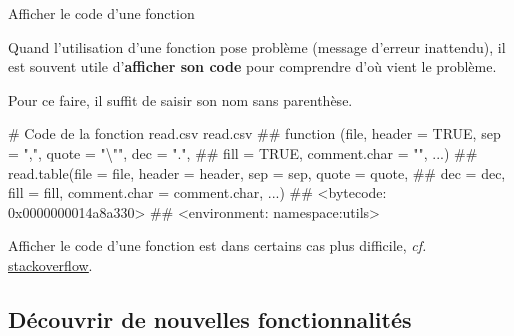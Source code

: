 \documentclass[12pt,ignorenonframetext,handout,]{beamer}
\newenvironment{Shaded}{}{}
\newcommand{\CommentTok}[1]{\textcolor[rgb]{0.00,0.50,0.00}{#1}}
\newcommand{\NormalTok}[1]{#1}
\renewenvironment{Shaded}{\begin{snugshade}}{\end{snugshade}}
\begin{document}
\begin{frame}[fragile]{Afficher le code d’une fonction}
\protect\hypertarget{afficher-le-code-dune-fonction}{}

Quand l’utilisation d’une fonction pose problème (message d’erreur
inattendu), il est souvent utile d’\textbf{afficher son code} pour
comprendre d’où vient le problème.

\pause Pour ce faire, il suffit de saisir son nom sans parenthèse.

\footnotesize

\begin{Shaded}
\begin{Highlighting}[]
\CommentTok{# Code de la fonction read.csv}
\NormalTok{read.csv}
\NormalTok{  ## function (file, header = TRUE, sep = ",", quote = "\textbackslash{}"", dec = ".", }
\NormalTok{  ##     fill = TRUE, comment.char = "", ...) }
\NormalTok{  ## read.table(file = file, header = header, sep = sep, quote = quote, }
\NormalTok{  ##     dec = dec, fill = fill, comment.char = comment.char, ...)}
\NormalTok{  ## <bytecode: 0x0000000014a8a330>}
\NormalTok{  ## <environment: namespace:utils>}
\end{Highlighting}
\end{Shaded}

\pause \normalsize

Afficher le code d’une fonction est dans certains cas plus difficile,
\emph{cf.}
\href{http://stackoverflow.com/questions/19226816/how-can-i-view-the-source-code-for-a-function}{\underline{stackoverflow}}.

\end{frame}

\hypertarget{decouvrir-de-nouvelles-fonctionnalites}{%
\subsection{Découvrir de nouvelles
fonctionnalités}\label{decouvrir-de-nouvelles-fonctionnalites}}
\end{document}
